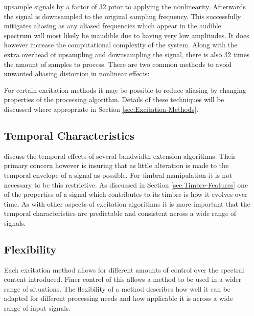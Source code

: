 			\citep{vetter2013estimation} upsample signals by a factor of 32 prior to applying
			the nonlinearity. Afterwards the signal is downsampled to the original sampling frequency. This
			successfully mitigates aliasing as any aliased frequencies which appear in the audible spectrum
			will most likely be inaudible due to having very low amplitudes. It does however increase the
			computational complexity of the system. Along with the extra overhead of upsampling and
			downsampling the signal, there is also 32 times the amount of samples to process.
			There are two common methods to avoid unwanted aliasing distortion in nonlinear effects:

			For certain excitation methods it may be possible to reduce aliasing by changing properties of the
			processing algorithm. Details of these techniques will be discussed where appropriate in Section
			\ref{sec:Excitation-Methods}.

	\subsection{Temporal Characteristics}
	\label{sec:Excitation-Evaluation-TemporalCharacteristics}
		\citep{larsen2004audio} discuss the temporal effects of several bandwidth extension algorithms. Their
		primary concern however is insuring that as little alteration is made to the temporal envelope of a signal
		as possible. For timbral manipulation it is not necessary to be this restrictive. As discussed in Section
		\ref{sec:Timbre-Features} one of the properties of a signal which contributes to its timbre is how it
		evolves over time. As with other aspects of excitation algorithms it is more important that the temporal
		characteristics are predictable and consistent across a wide range of signals.

	\subsection{Flexibility}
	\label{sec:Excitation-Evaluation-Flexibility}
		Each excitation method allows for different amounts of control over the spectral content introduced. Finer
		control of this allows a method to be used in a wider range of situations. The flexibility of a method
		describes how well it can be adapted for different processing needs and how applicable it is across a wide
		range of input signals.


